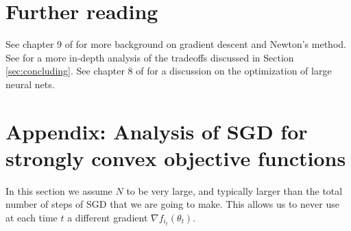 \documentclass[11pt,nocut]{article}
\begin{document}
\section*{Further reading}

See chapter 9 of \cite{boyd2004convex} for more background on gradient descent and Newton's method.
See \cite{bottou2008tradeoffs} for a more in-depth analysis of the tradeoffs discussed in Section \ref{sec:concluding}.
See chapter 8 of \cite{goodfellow2016deep} for a discussion on the optimization of large neural nets.

\vspace{1cm}
\centerline{}





\section*{Appendix: Analysis of SGD for strongly convex objective functions}

In this section we assume $N$ to be very large, and typically larger than the total number of steps of SGD that we are going to make. This allows us to never use at each time $t$ a different gradient $\nabla f_{i_t}(\theta_t)$.
\end{document}
